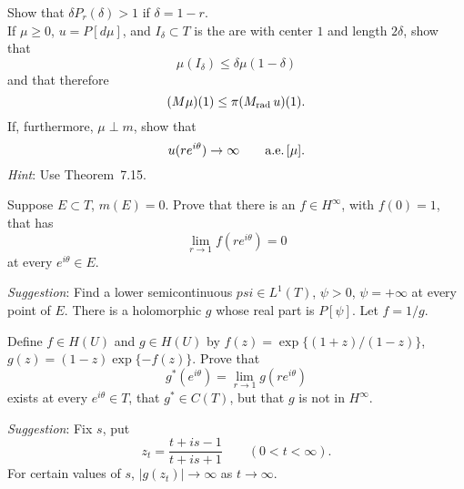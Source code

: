 \begin{enumerate}
\begin{excopy}
 Show that \(\delta P_r(\delta) > 1\) if \(\delta = 1 - r\).\\
 If \(\mu \geq 0\), \(u = P[d\mu]\), and \(I_\delta \subset T\)
is the are with center $1$ and length \(2\delta\), show that
\begin{equation*}
\mu(I_\delta) \leq \delta\mu(1 - \delta)
\end{equation*}
and that therefore
\begin{equation*}
(M\mu)(1) \leq \pi(M_{\textnormal{rad}}\,u)(1).
\end{equation*}
 If, furthermore, \(\mu \perp m\), show that
\begin{equation*}
u(re^{i\theta}) \to \infty \qquad \textrm{a.e.}\,[\mu].
\end{equation*}
\emph{Hint}: Use Theorem~7.15.
\end{excopy}


\begin{excopy}
Suppose \(E \subset T\), \(m(E) = 0\).
 Prove that there is an \(f \in H^\infty\), with \(f(0) = 1\), that has
\begin{equation*}
\lim_{r\to 1} f(re^{i\theta}) = 0
\end{equation*}
at every \(e^{i\theta} \in E\).

\emph{Suggestion}: Find a lower semicontinuous 
 \(psi \in L^1(T)\), \(\psi > 0\), \(\psi = +\infty\) at every point of $E$.
 There
is a holomorphic $g$ whose real part is \(P[\psi]\). Let \(f= 1/g\).
\end{excopy}


\begin{excopy}
Define \(f \in H(U)\) and \(g \in H(U)\) by 
\(f(z) = \exp \{(1 + z)/(1 - z)\}\), \(g(z) = (1 - z) \exp \{-f(z)\}\). Prove
that
\begin{equation*}
g^*(e^{i\theta}) = \lim_{r\to 1} g(re^{i\theta})
\end{equation*}
exists at every \(e^{i\theta} \in T\), that \(g^* \in C(T)\),
 but that $g$ is not in \(H^\infty\).

\emph{Suggestion}: Fix $s$, put
\begin{equation*}
 z_t = \frac{t + is - 1}{t + is + 1} \qquad (0 < t < \infty).
\end{equation*}
For certain values of $s$, \(|g(z_t)| \to \infty\) as \(t \to \infty\).

\end{excopy}



\end{enumerate}

